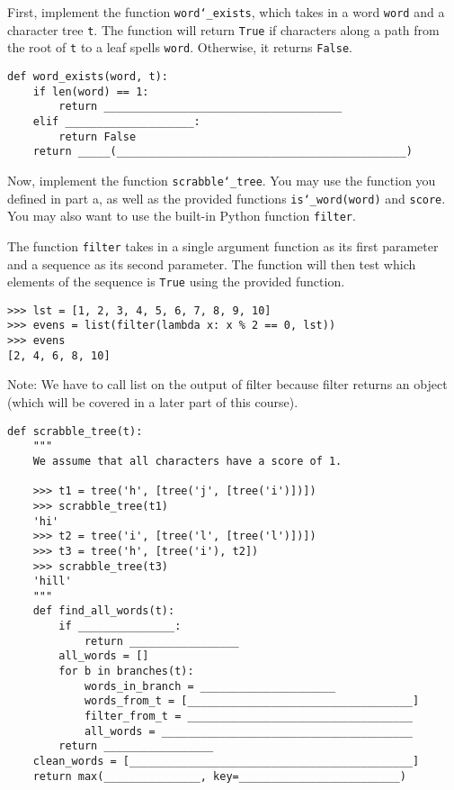 \begin{parts}
\item First, implement the function \texttt{word\char`_exists}, which takes in a word \texttt{word} and a character tree \texttt{t}. The function will return \texttt{True} if characters along a path from the root of \texttt{t} to a leaf spells \texttt{word}. Otherwise, it returns \texttt{False}.

\begin{lstlisting}
def word_exists(word, t):
    if len(word) == 1:
        return _____________________________________
    elif ____________________:
        return False
    return _____(_____________________________________________)

\end{lstlisting}

\item Now, implement the function \texttt{scrabble\char`_tree}. You may use the function you defined in part a, as well as the provided functions \texttt{is\char`_word(word)} and \texttt{score}. You may also want to use the built-in Python function \texttt{filter}.

The function \texttt{filter} takes in a single argument function as its first parameter and a sequence as its second parameter. The function will then test which elements of the sequence is \texttt{True} using the provided function.

\begin{lstlisting}
>>> lst = [1, 2, 3, 4, 5, 6, 7, 8, 9, 10]
>>> evens = list(filter(lambda x: x % 2 == 0, lst))
>>> evens
[2, 4, 6, 8, 10]
\end{lstlisting}

Note: We have to call list on the output of filter because filter returns an object (which will be covered in a later part of this course).

\newpage
\begin{lstlisting}
def scrabble_tree(t):
    """
    We assume that all characters have a score of 1.

    >>> t1 = tree('h', [tree('j', [tree('i')])])
    >>> scrabble_tree(t1)
    'hi'
    >>> t2 = tree('i', [tree('l', [tree('l')])])
    >>> t3 = tree('h', [tree('i'), t2])
    >>> scrabble_tree(t3)
    'hill'
    """
    def find_all_words(t):
        if _______________:
            return _________________
        all_words = []
        for b in branches(t):
            words_in_branch = _____________________
            words_from_t = [___________________________________]
            filter_from_t = ___________________________________
            all_words = _______________________________________
        return _________________
    clean_words = [____________________________________________]
    return max(_______________, key=_________________________)

\end{lstlisting}
\end{parts}

